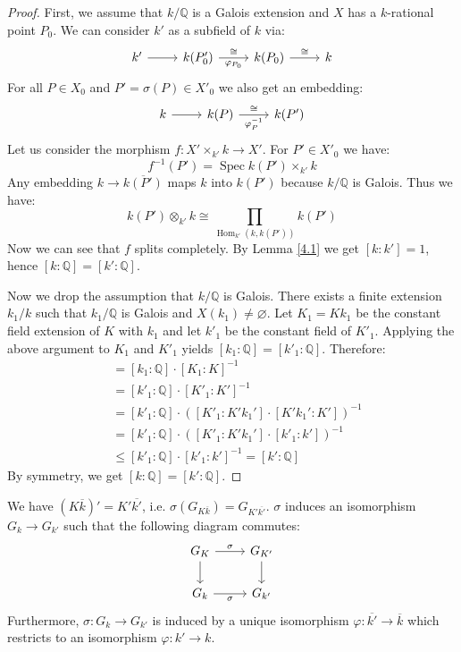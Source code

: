 \begin{proof}
First, we assume that $k/\mathbb{Q}$ is a Galois extension and $X$ has a $k$-rational point $P_0$. We can consider $k'$ as a subfield of $k$ via: 
\[\begin{tikzcd}
k'\ar[r] & k(P'_0)\ar[r, "\varphi_{P_0}"', "\cong"] & k(P_0) \ar[r, "\cong"] & k
\end{tikzcd}\]
For all $P\in X_0$ and $P'=\sigma(P)\in X'_0$ we also get an embedding:
\[ \begin{tikzcd}
k \ar[r] & k(P) \ar[r, "\varphi_P^{-1}"', "\cong"] & k(P')
\end{tikzcd} \]
Let us consider the morphism $f:X'\times_{k'} k\to X'$. For $P'\in X'_0$ we have:
\[ f^{-1}(P') = \operatorname{Spec} k(P')\times_{k'} k \]
Any embedding $k\to \overline{k(P')}$ maps $k$ into $k(P')$ because $k/\mathbb{Q}$ is Galois. Thus we have:
\[ k(P')\otimes_{k'} k\cong \prod_{\operatorname{Hom}_{k'}(k, k(P'))} k(P') \]
Now we can see that $f$ splits completely. By Lemma \ref{4.1} we get $[k:k'] = 1$, hence $[k:\mathbb{Q}]= [k':\mathbb{Q}]$.

Now we drop the assumption that $k/\mathbb{Q}$ is Galois. There exists a finite extension $k_1/k$ such that $k_1/\mathbb{Q}$ is Galois and $X(k_1)\neq\varnothing$. Let $K_1 = Kk_1$ be the constant field extension of $K$ with $k_1$ and let $k'_1$ be the constant field of $K'_1$. Applying the above argument to $K_1$ and $K'_1$ yields $[k_1:\mathbb{Q}] = [k'_1:\mathbb{Q}]$. Therefore:
\begin{align*}
[k:\mathbb{Q}] &= [k_1:\mathbb{Q}]\cdot [K_1:K]^{-1} \\
&= [k'_1:\mathbb{Q}]\cdot [K'_1:K']^{-1}\\
&= [k'_1:\mathbb{Q}]\cdot ([K'_1: K'k_1'] \cdot [K'k_1':K'])^{-1}\\
&= [k'_1:\mathbb{Q}]\cdot  ([K'_1: K'k_1'] \cdot [k'_1:k'])^{-1} \\
&\leq [k'_1:\mathbb{Q}]\cdot [k'_1:k']^{-1} = [k':\mathbb{Q}]
\end{align*}
By symmetry, we get $[k:\mathbb{Q}] = [k':\mathbb{Q}]$.
\end{proof}

\begin{lemma}\label{4.2}
We have $(K\overline{k})'=K'\overline{k'}$, i.e. $\sigma(G_{K\overline{k}})=G_{K'\overline{k'}}$. $\sigma$ induces an isomorphism $G_k\to G_{k'}$ such that the following diagram commutes:
\[ \begin{tikzcd}
G_K \ar[r, "\sigma"] \ar[d] & G_{K'}\ar[d]\\
G_k \ar[r, "\sigma"'] & G_{k'}
\end{tikzcd} \]
Furthermore, $\sigma:G_k\to G_{k'}$ is induced by a unique isomorphism $\varphi:\overline{k'}\to\overline{k}$ which restricts to an isomorphism $\varphi: k'\to k$.
\end{lemma}

